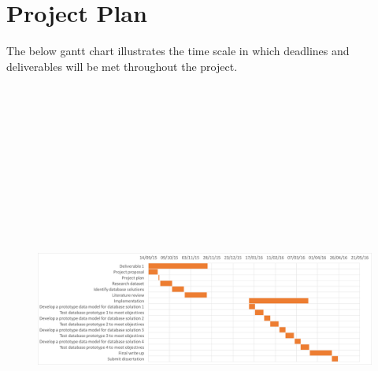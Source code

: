 \section{Project Plan}
The below gantt chart illustrates the time scale in which deadlines and deliverables will be met throughout the project.
\begin{figure}
    \includegraphics[height=15cm, width = 1\linewidth]{images/gantt}
\end{figure}
